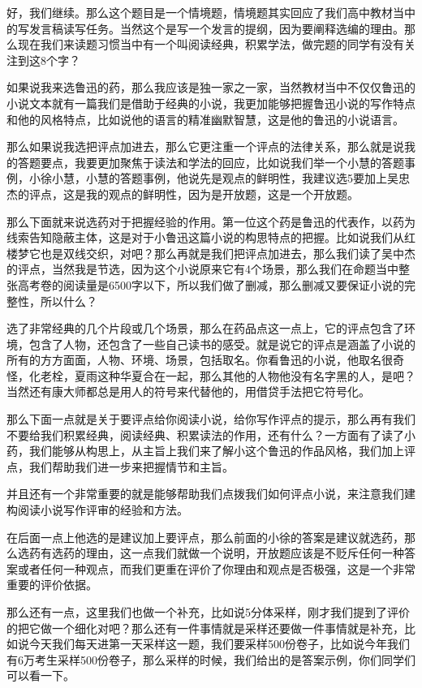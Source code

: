 \documentclass{ctexart}
\renewcommand{\\}{\par}
\begin{document}
好，我们继续。那么这个题目是一个情境题，情境题其实回应了我们高中教材当中的写发言稿读写任务。当然这个是写一个发言的提纲，因为要阐释选编的理由。那么现在我们来读题习惯当中有一个叫阅读经典，积累学法，做完题的同学有没有关注到这8个字？

如果说我来选鲁迅的药，那么我应该是独一家之一家，当然教材当中不仅仅鲁迅的小说文本就有一篇我们是借助于经典的小说，我更加能够把握鲁迅小说的写作特点和他的风格特点，比如说他的语言的精准幽默智慧，这是他的鲁迅的小说语言。

那么如果说我选把评点加进去，那么它更注重一个评点的法律关系，那么就是说我的答题要点，我要更加聚焦于读法和学法的回应，比如说我们举一个小慧的答题事例，小徐小慧，小慧的答题事例，他说先是观点的鲜明性，我建议选5要加上吴忠杰的评点，这是我的观点的鲜明性，因为是开放题，这是一个开放题。

那么下面就来说选药对于把握经验的作用。第一位这个药是鲁迅的代表作，以药为线索告知隐蔽主体，这是对于小鲁迅这篇小说的构思特点的把握。比如说我们从红楼梦它也是双线交织，对吧？那么再就是我们把评点加进去，那么我们读了吴中杰的评点，当然我是节选，因为这个小说原来它有4个场景，那么我们在命题当中整张高考卷的阅读量是6500字以下，所以我们做了删减，那么删减又要保证小说的完整性，所以什么？

选了非常经典的几个片段或几个场景，那么在药品点这一点上，它的评点包含了环境，包含了人物，还包含了一些自己读书的感受。就是说它的评点是涵盖了小说的所有的方方面面，人物、环境、场景，包括取名。你看鲁迅的小说，他取名很奇怪，化老栓，夏雨这种华夏合在一起，那么其他的人物他没有名字黑的人，是吧？当然还有康大师都总是用人的符号来代替他的，用借贷手法把它符号化。

那么下面一点就是关于要评点给你阅读小说，给你写作评点的提示，那么再有我们不要给我们积累经典，阅读经典、积累读法的作用，还有什么？一方面有了读了小药，我们能够从构思上，从主旨上我们来了解小这个鲁迅的作品风格，我们加上评点，我们帮助我们进一步来把握情节和主旨。

并且还有一个非常重要的就是能够帮助我们点拨我们如何评点小说，来注意我们建构阅读小说写作评审的经验和方法。

在后面一点上他选的是建议加上要评点，那么前面的小徐的答案是建议就选药，那么选药有选药的理由，这一点我们就做一个说明，开放题应该是不贬斥任何一种答案或者任何一种观点，而我们更重在评价了你理由和观点是否极强，这是一个非常重要的评价依据。

那么还有一点，这里我们也做一个补充，比如说5分体采样，刚才我们提到了评价的把它做一个细化对吧？那么还有一件事情就是采样还要做一件事情就是补充，比如说今天我们每天进第一天采样这一题，我们要采样500份卷子，比如说今年我们有6万考生采样500份卷子，那么采样的时候，我们给出的是答案示例，你们同学们可以看一下。
\end{document}
